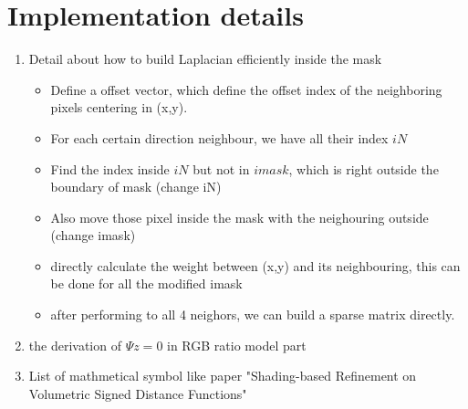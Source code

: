 \chapter{Implementation details}\label{appendix:implement}

\begin{enumerate}
    \item Detail about how to build Laplacian efficiently inside the mask
    \begin{itemize}
        \item Define a offset vector, which define the offset index of the neighboring pixels centering in (x,y).
        \item For each certain direction neighbour, we have all their index $iN$
        \item Find the index inside $iN$ but not in $imask$, which is right outside the boundary of mask (change iN)
        \item Also move those pixel inside the mask with the neighouring outside (change imask)
        \item directly calculate the weight between (x,y) and its neighbouring, this can be done for all the modified imask
        \item after performing to all 4 neighors, we can build a sparse matrix directly.
    \end{itemize}
    
    
    \item the derivation of $\Psi z = 0$ in RGB ratio model part
    \item List of mathmetical symbol like paper "Shading-based Refinement on Volumetric Signed Distance Functions"
\end{enumerate}
